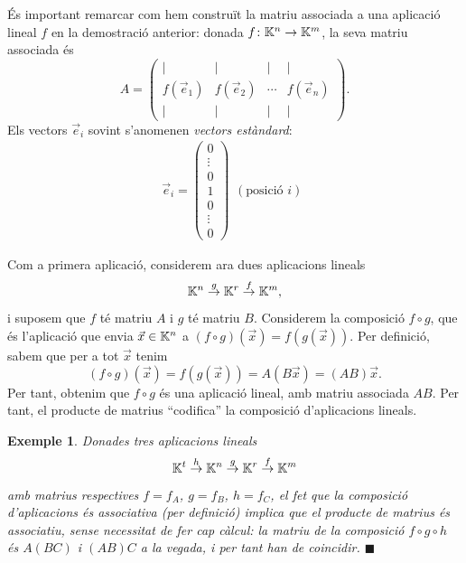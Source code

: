 \documentclass[
  11pt,
]{book}
\numberwithin{dummy}{section}
\theoremstyle{maincolornumbox}
\theoremstyle{blacknumex}
\newtheorem{exampleT}{Exemple}[chapter]
\theoremstyle{blacknumbox}
\theoremstyle{maincolornum}
\newenvironment{example}{\begin{exampleT}}{\hfill{\tiny\ensuremath{\blacksquare}}\end{exampleT}}
\newlength\esp
\begin{document}
És important remarcar com hem construït la matriu associada a una
aplicació lineal \(f\) en la demostració anterior: donada
\(f\colon \mathbb{K}^n\rightarrow \mathbb{K}^m\), la seva matriu associada és
\[A=\begin{pmatrix}
\mid & \mid &\mid & \mid\\
f(\vec e_1) & f(\vec e_2) &\cdots&f(\vec e_n)\\
\mid & \mid &\mid & \mid
\end{pmatrix}.\] Els vectors \(\vec e_i\) sovint s'anomenen \emph{vectors
estàndard}: \[\vec e_i = \begin{pmatrix}
0\\\vdots\\0\\1\\0\\\vdots\\0
\end{pmatrix}
\begin{matrix}
\phantom{0}\\\phantom{\vdots}\\\phantom{0}\\(\textrm{posició } i)\\\phantom{0}\\\phantom{\vdots}\\\phantom{0}
\end{matrix}\]

Com a primera aplicació, considerem ara dues aplicacions lineals
\[\mathbb{K}^n \stackrel{g}{\rightarrow} \mathbb{K}^r \stackrel{f}{\rightarrow} \mathbb{K}^m,\]
i suposem que \(f\) té matriu \(A\) i \(g\) té matriu \(B\). Considerem la
composició \(f\circ g\), que és l'aplicació que envia \(\vec x\in \mathbb{K}^n\) a
\((f\circ g)(\vec x) = f(g(\vec x))\). Per definició, sabem que per a tot
\(\vec x\) tenim
\[(f\circ g)(\vec x) = f(g(\vec x)) = A(B\vec x) = (AB)\vec x.\] Per
tant, obtenim que \(f\circ g\) és una aplicació lineal, amb matriu
associada \(AB\). Per tant, el producte de matrius ``codifica'' la
composició d'aplicacions lineals.

\begin{example}
Donades tres aplicacions lineals
\[\mathbb{K}^t\stackrel{h}{\rightarrow}\mathbb{K}^n \stackrel{g}{\rightarrow} \mathbb{K}^r \stackrel{f}{\rightarrow} \mathbb{K}^m\]
amb matrius respectives \(f=f_A\), \(g=f_B\), \(h=f_C\), el fet que la
composició d'aplicacions és associativa (per definició) implica que el
producte de matrius és associatiu, sense necessitat de fer cap càlcul:
la matriu de la composició \(f\circ g \circ h\) és \(A(BC)\) i \((AB)C\) a la
vegada, i per tant han de coincidir.
\end{example}
\end{document}
